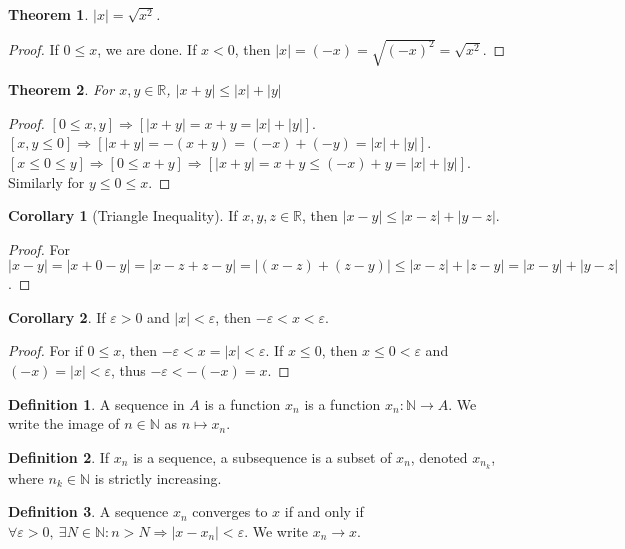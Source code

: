 \documentclass[oneside]{book}
\newtheorem{theorem}{Theorem}[section]
\theoremstyle{definition}
\newtheorem{definition}{Definition}[section]
\newtheorem{corollary}{Corollary}[section]
\begin{document}
\begin{theorem}
$|x| = \sqrt{x^2}$.
\end{theorem}
\begin{proof}
If $0 \leq x$, we are done. If $x<0$, then $|x| = (-x) = \sqrt{(-x)^2} = \sqrt{x^2}$.
\end{proof}

\begin{theorem}
For $x,y \in \mathbb{R}$, $|x+y|\leq |x|+|y|$
\end{theorem}
\begin{proof}
$[0\leq x,y]\Rightarrow [|x+y| = x+y = |x|+|y|]$. $[x,y\leq 0]\Rightarrow [|x+y| = -(x+y) = (-x)+(-y)=|x|+|y|]$. $[x\leq 0 \leq y]\Rightarrow [0\leq x+y]\Rightarrow [|x+y| = x+y \leq (-x)+y=|x|+|y|]$. Similarly for $y\leq 0 \leq x$.
\end{proof}

\begin{corollary}[Triangle Inequality]
If $x,y,z\in \mathbb{R}$, then $|x-y| \leq |x-z|+|y-z|$.
\end{corollary}
\begin{proof}
For $|x-y| = |x+ 0 - y| = |x-z+z-y| = |(x-z)+(z-y)| \leq |x-z|+|z-y| = |x-y|+|y-z|$.
\end{proof}

\begin{corollary}
If $\varepsilon >0$ and $|x|<\varepsilon$, then $-\varepsilon < x < \varepsilon$.
\end{corollary}
\begin{proof}
For if $0\leq x$, then $-\varepsilon< x=|x|< \varepsilon$. If $x\leq 0$, then $x\leq 0<\varepsilon$ and $(-x)=|x|<\varepsilon$, thus $-\varepsilon < -(-x) = x$.
\end{proof}

\begin{definition}
A sequence in $A$ is a function $x_n$ is a function $x_n:\mathbb{N}\rightarrow A$. We write the image of $n\in \mathbb{N}$ as $n\mapsto x_n$.
\end{definition}

\begin{definition}
If $x_n$ is a sequence, a subsequence is a subset of $x_n$, denoted $x_{n_k}$, where $n_k\in \mathbb{N}$ is strictly increasing.
\end{definition}

\begin{definition}
A sequence $x_n$ converges to $x$ if and only if $\forall \varepsilon>0,\ \exists N\in \mathbb{N}: n>N\Rightarrow |x-x_n|<\varepsilon$. We write $x_n \rightarrow x$.
\end{definition}
\end{document}
